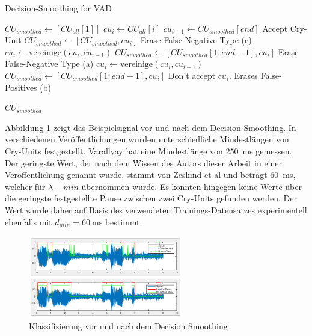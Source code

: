 \begin{algorithm}[h]
	\caption{Decision-Smoothing for VAD}
	\label{alg:decisionSmoothing}
	\begin{algorithmic}[1]
		\State $CU_{smoothed} \gets[CU_{all}[1]] $
			\State $cu_i \gets CU_{all}[i]$
			\State $cu_{i-1} \gets CU_{smoothed}[end]$
			\State \Comment Accept Cry-Unit
					\State $CU_{smoothed} \gets [CU_{smoothed}, cu_i] $
			\Else
					\State \Comment Erase False-Negative Type (c)
					\State $cu_i \gets \text{vereinige}(cu_i, cu_{i-1})$
					\State $CU_{smoothed} \gets [CU_{smoothed}[1:end-1], cu_i] $
			\EndIf
			\Else
			\State \Comment Erase False-Negative Type (a)
			\State $cu_i \gets \text{vereinige}(cu_i, cu_{i-1})$
			\State $CU_{smoothed} \gets [CU_{smoothed}[1:end-1], cu_i] $
			\Else
			\State \Comment Don't accept $cu_i$. Erases False-Positives (b)
			\EndIf
			\EndIf
		\EndFor
		
		\Return $CU_{smoothed}$
		\EndFunction
		
	\end{algorithmic}
\end{algorithm}

Abbildung \ref{img:after-smoothing} zeigt das Beispielsignal vor und nach dem Decision-Smoothing. In verschiedenen Veröffentlichungen wurden unterschiedliche Mindestlängen von Cry-Units festgestellt. Varallyay \cite[S. 8]{cry_thesis} hat eine Mindestlänge von \SI{250}{\milli\second} gemessen. Der geringste Wert, der nach dem Wissen des Autors dieser Arbeit in einer Veröffentlichung genannt wurde, stammt von Zeskind et al \cite[S. 325]{rythmic} und beträgt  \SI{60}{\milli\second}, welcher für $\lambda-{min}$ übernommen wurde. Es konnten hingegen keine Werte über die geringste festgestellte Pause zwischen zwei Cry-Units gefunden werden. Der Wert wurde daher auf Basis des verwendeten Trainings-Datensatzes experimentell ebenfalls mit $d_{min} = \SI{60}{\milli\second}$ bestimmt. 

\begin{figure}[h]
	\centering
	\includegraphics[width=0.6\textwidth]{bilder/smoothing04.png}
	\caption{Klassifizierung vor und nach dem Decision Smoothing}
	\label{img:after-smoothing}
\end{figure}

